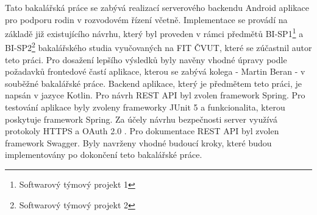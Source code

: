 Tato bakalářská práce se zabývá realizací serverového backendu Android aplikace pro podporu rodin v rozvodovém řízení včetně. Implementace se provádí na základě již existujícího návrhu, který byl proveden v rámci předmětů BI-SP1\footnote{Softwarový týmový projekt 1} a BI-SP2\footnote{Softwarový týmový projekt 2} bakalářského studia vyučovaných na FIT ČVUT, které se zúčastnil autor teto práci. Pro dosažení lepšího výsledků byly navěny vhodné úpravy podle požadavků frontedové častí aplikace, kterou se zabývá kolega - Martin Beran - v souběžné bakalářské práce. Backend aplikace, který je předmětem teto práci, je napsán v jazyce Kotlin. Pro návrh REST API byl zvolen framework Spring. Pro testování aplikace byly zvoleny frameworky JUnit 5 a funkcionalita, kterou poskytuje framework Spring. Za účely návrhu bezpečnosti server využívá protokoly HTTPS a OAuth 2.0 . Pro dokumentace REST API byl zvolen framework Swagger. Byly navrženy vhodné budoucí kroky, které budou implementovány po dokončení teto bakalářské práce.